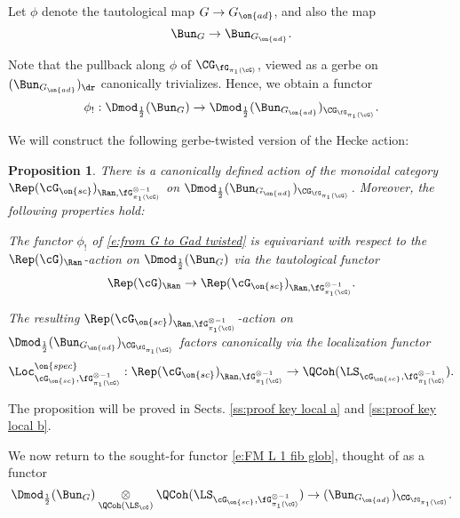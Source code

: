 \documentclass[9pt]{amsart}
\newtheorem{prop}[subsubsection]{Proposition}
\theoremstyle{remark}
\theoremstyle{definition}
\theoremstyle{remark}
\numberwithin{equation}{section}
\begin{document}
\sssec{}

Let $\phi$ denote the tautological map $G\to G_{\on{ad}}$, and also the map
$$\Bun_G\to \Bun_{G_{\on{ad}}}.$$

Note that the pullback along $\phi$ of $\CG_{\fG_{\pi_1(\cG)}}$, viewed as a gerbe on $(\Bun_{G_{\on{ad}}})_\dr$
canonically trivializes. Hence, we obtain a functor
\begin{equation} \label{e:from G to Gad twisted}
\phi_!:\Dmod_{\frac{1}{2}}(\Bun_G) \to \Dmod_{\frac{1}{2}}(\Bun_{G_{\on{ad}}})_{\CG_{\fG_{\pi_1(\cG)}}}.
\end{equation} 

\sssec{}

We will construct the following gerbe-twisted version of the Hecke action: 

\begin{prop}  \label{p:key local} 
There is a canonically defined action of the monoidal category 
$\Rep(\cG_{\on{sc}})_{\Ran,\fG^{\otimes -1}_{\pi_1(\cG)}}$ on $\Dmod_{\frac{1}{2}}(\Bun_{G_{\on{ad}}})_{\CG_{\fG_{\pi_1(\cG)}}}$.
Moreover, the following properties hold: 

\smallskip

The functor $\phi_!$ of \eqref{e:from G to Gad twisted} is equivariant with respect to the $\Rep(\cG)_\Ran$-action on $\Dmod_{\frac{1}{2}}(\Bun_G)$ via
the tautological functor 
$$\Rep(\cG)_\Ran\to \Rep(\cG_{\on{sc}})_{\Ran,\fG^{\otimes -1}_{\pi_1(\cG)}}.$$

\smallskip

 The resulting $\Rep(\cG_{\on{sc}})_{\Ran,\fG^{\otimes -1}_{\pi_1(\cG)}}$-action on $\Dmod_{\frac{1}{2}}(\Bun_{G_{\on{ad}}})_{\CG_{\fG_{\pi_1(\cG)}}}$
factors canonically via the localization functor
$$\Loc^{\on{spec}}_{\cG_{\on{sc}},\fG^{\otimes -1}_{\pi_1(\cG)}}:\Rep(\cG_{\on{sc}})_{\Ran,\fG^{\otimes -1}_{\pi_1(\cG)}}\to 
\QCoh(\LS_{\cG_{\on{sc}},\fG^{\otimes -1}_{\pi_1(\cG)}}).$$

\end{prop} 

The proposition will be proved in Sects. \ref{ss:proof key local a} and \ref{ss:proof key local b}. 

\sssec{}

We now return to the sought-for functor \eqref{e:FM L 1 fib glob}, thought of as a functor
\begin{equation} \label{e:FM L LHS and RHS}
\Dmod_{\frac{1}{2}}(\Bun_G)\underset{\QCoh(\LS_\cG)}\otimes \QCoh(\LS_{\cG_{\on{sc}},\fG^{\otimes -1}_{\pi_1(\cG)}})\to
(\Bun_{G_{\on{ad}}})_{\CG_{\fG_{\pi_1(\cG)}}}.
\end{equation}
\end{document}
